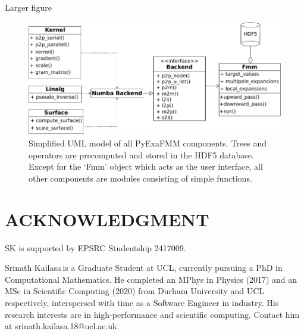\documentclass{IEEEcsmag}
\begin{document}
Larger figure
\begin{figure}
	\centerline{\includegraphics {figures/software.pdf}}
	\caption{Simplified UML model of all PyExaFMM components. Trees and operators are precomputed and stored in the HDF5 database. Except for the `Fmm' object which acts as the user interface, all other components are modules consisting of simple functions.}
	\label{fig:design}
\end{figure}






\section{ACKNOWLEDGMENT}

SK is supported by EPSRC Studentship 2417009.





\begin{IEEEbiography}{Srinath Kailasa}{\,}is a Graduate Student at UCL, currently pursuing a PhD in Computational Mathematics. He completed an MPhys in Physics (2017) and an MSc in Scientific Computing (2020) from Durham University and UCL respectively, interspersed with time as a Software Engineer in industry. His research interests are in high-performance and scientific computing. Contact him at srinath.kailasa.18@ucl.ac.uk.
\end{IEEEbiography}
\end{document}
